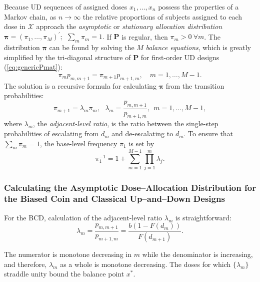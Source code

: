 Because UD sequences of assigned doses $x_1,\ldots,x_n$ possess the properties of a Markov chain, as $n\to\infty$ the relative proportions of subjects assigned to each dose in $\mathcal{X}$ approach the \emph{asymptotic} or \emph{stationary allocation distribution} $\boldsymbol{\pi}=\left(\pi_1,\ldots,\pi_M\right)^{\prime};\ \ \sum_m \pi_m=1.$  If $\mathbf{P}$ is regular, then $\pi_m>0\ \forall m$. The distribution $\boldsymbol{\pi}$ can be found by solving the $M$ \emph{balance equations}, which is greatly simplified by the tri-diagonal structure of $\mathbf{P}$ for first-order UD designs (\ref{eq:genericPmat}):
\begin{equation}\label{eq:balance}
\pi_mp_{m,m+1}=\pi_{m+1}p_{m+1,m},\quad m=1,\ldots,M-1.
\end{equation}
The solution is a recursive formula for calculating $\boldsymbol{\pi}$ from the transition probabilities:
\begin{equation}\label{eq:balance_solution}
\pi_{m+1}=\lambda_m \pi_m,\ \ \ \lambda_m=\frac{p_{m,m+1}}{p_{m+1,m}},\ \  m=1,\ldots,M-1,
\end{equation}
where $\lambda_m$,  the \emph{adjacent-level ratio}, is the ratio between the single-step probabilities of escalating from $d_m$ and de-escalating to $d_{m}$. To ensure that $\sum_m \pi_m=1$, the base-level frequency $\pi_1$ is set by
\begin{equation*}
\pi_1^{-1}=1+\displaystyle\sum_{m=1}^{M-1}\displaystyle\prod_{j=1}^m\lambda_j.
\end{equation*}

\subsubsection{Calculating the Asymptotic Dose--Allocation Distribution for the Biased Coin
and Classical Up--and--Down Designs}

For the BCD, calculation of the adjacent-level ratio $\lambda_m$ is straightforward:
\begin{equation}\label{eq:BCDlambda}
\lambda_m=\frac{p_{m,m+1}}{p_{m+1,m}}=\frac{b\left(1-F(d_m)\right)}{F(d_{m+1})}.
\end{equation}

\noindent The numerator is monotone decreasing in $m$ while the denominator is increasing, and therefore, $\lambda_m$ as a whole is monotone decreasing. The doses for which $\{\lambda_m\}$ straddle unity bound the balance point $x^*$.

